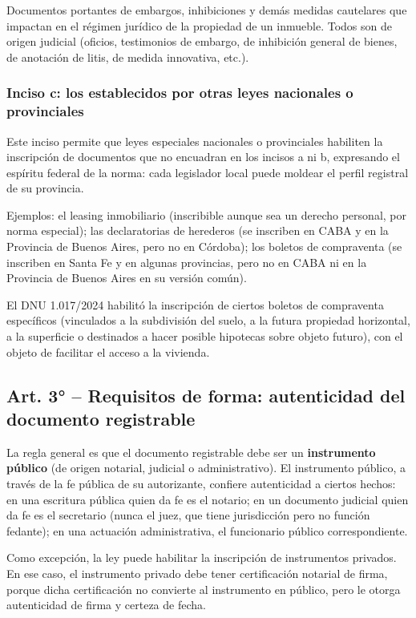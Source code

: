 \documentclass[12pt,oneside]{book}
\begin{document}
Documentos portantes de embargos, inhibiciones y demás medidas cautelares que impactan en el régimen jurídico de la propiedad de un inmueble. Todos son de origen judicial (oficios, testimonios de embargo, de inhibición general de bienes, de anotación de litis, de medida innovativa, etc.).

\subsubsection{Inciso c: los establecidos por otras leyes nacionales o provinciales}

Este inciso permite que leyes especiales nacionales o provinciales habiliten la inscripción de documentos que no encuadran en los incisos a ni b, expresando el espíritu federal de la norma: cada legislador local puede moldear el perfil registral de su provincia.

Ejemplos: el leasing inmobiliario (inscribible aunque sea un derecho personal, por norma especial); las declaratorias de herederos (se inscriben en CABA y en la Provincia de Buenos Aires, pero no en Córdoba); los boletos de compraventa (se inscriben en Santa Fe y en algunas provincias, pero no en CABA ni en la Provincia de Buenos Aires en su versión común).

\begin{note}
El DNU 1.017/2024 habilitó la inscripción de ciertos boletos de compraventa específicos (vinculados a la subdivisión del suelo, a la futura propiedad horizontal, a la superficie o destinados a hacer posible hipotecas sobre objeto futuro), con el objeto de facilitar el acceso a la vivienda.
\end{note}

\subsection{Art. 3° -- Requisitos de forma: autenticidad del documento registrable}

La regla general es que el documento registrable debe ser un \textbf{instrumento público} (de origen notarial, judicial o administrativo). El instrumento público, a través de la fe pública de su autorizante, confiere autenticidad a ciertos hechos: en una escritura pública quien da fe es el notario; en un documento judicial quien da fe es el secretario (nunca el juez, que tiene jurisdicción pero no función fedante); en una actuación administrativa, el funcionario público correspondiente.

Como excepción, la ley puede habilitar la inscripción de instrumentos privados. En ese caso, el instrumento privado debe tener certificación notarial de firma, porque dicha certificación no convierte al instrumento en público, pero le otorga autenticidad de firma y certeza de fecha.
\end{document}
